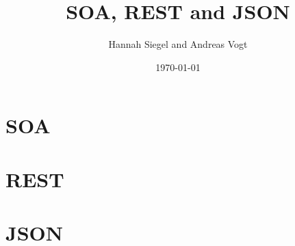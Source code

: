 \documentclass[a4paper]{article}
\title{SOA, REST and JSON}
\author{Hannah Siegel and Andreas Vogt}
\date{\today}
\begin{document}
\maketitle

\tableofcontents
\newpage
\part{SOA}
\newpage
\part{REST}
\newpage
\part{JSON}
\newpage
\printglossaries
\listoffigures
\listoftables
\newpage


\end{document}
